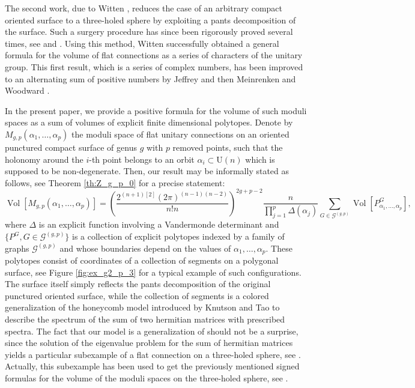 \documentclass[11pt,a4paper]{amsart}
\providecommand{\U}{\mathrm U}
\providecommand{\Vol}{\operatorname{Vol}}
\numberwithin{equation}{section}
\theoremstyle{definition}
\begin{document}
The second work, due to Witten \cite{witten1992two}, reduces the case of an arbitrary compact oriented surface to a three-holed sphere 
by exploiting a pants decomposition of the surface. 
Such a surgery procedure has since been rigorously proved several times, see \cite{jeffrey1998intersection} and \cite{Meinrenken_Woodward}. 
Using this method, Witten successfully obtained a general formula for the volume of flat connections as a series of characters of the unitary group. 
This first result, which is a series of complex numbers, has been improved to an alternating sum of positive numbers by Jeffrey \cite{jeffrey1994extended} 
and then Meinrenken and Woodward \cite{Meinrenken_Woodward}.

In the present paper, we provide a positive formula for the volume of such moduli spaces as  a sum of volumes of explicit finite dimensional polytopes. Denote by $M_{g,p}(\alpha_1,\ldots,\alpha_p)$ the moduli space of flat unitary connections on an oriented punctured compact surface of genus $g$ with $p$ removed points, such that the holonomy around the $i$-th point belongs to an orbit $\alpha_i\subset \U(n)$ which is supposed to be non-degenerate. Then, our result may be informally stated as follows, see Theorem \ref{th:Z_g_p_0} for a precise statement:
$$\Vol\left[M_{g,p}(\alpha_1,\ldots,\alpha_p)\right]=\left(\frac{2^{(n+1)[2]}(2\pi)^{(n-1)(n-2)}}{n!n}\right)^{2g+p-2}\frac{n}{\prod_{j=1}^{p} \Delta(\alpha_j)}\sum_{G\in \mathcal{G}^{(g,p)}}\Vol\left[P^G_{\alpha_1,\ldots,\alpha_p}\right],$$
where $\Delta$ is an explicit function involving a Vandermonde determinant and $\{P^G, G\in \mathcal{G}^{(g,p)}\}$ is a collection of explicit polytopes indexed by a family of graphs $\mathcal{G}^{(g,p)}$ and whose boundaries depend on the values of $\alpha_1,\ldots,\alpha_p$. These polytopes consist of coordinates of a collection of segments on a polygonal surface, see Figure \ref{fig:ex_g2_p_3} for a typical example of such configurations. The surface itself simply reflects the pants decomposition 
of the original punctured oriented surface, while the collection of segments is a colored generalization of the honeycomb model introduced by 
Knutson and Tao \cite{knutson2004honeycomb} to describe the spectrum of the sum of two hermitian matrices with prescribed spectra. 
The fact that our model is a generalization of \cite{knutson2004honeycomb} should not be a surprise, since the solution of the eigenvalue problem 
for the sum of hermitian matrices yields a particular subexample of a flat connection on a three-holed sphere, see \cite{Klyachko, belkale2008quantum}. 
Actually, this subexample has been used to get the previously mentioned signed formulas for the volume of the moduli spaces on the three-holed sphere, see \cite{Meinrenken_Woodward}.
\end{document}
